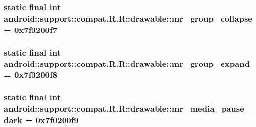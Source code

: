 \hypertarget{classandroid_1_1support_1_1compat_1_1_r_1_1drawable_46a75068daf21e12e8c830ebf70fca6a}{
\subsubsection[{mr\_\-group\_\-collapse}]{\setlength{\rightskip}{0pt plus 5cm}static final int android::support::compat.R.R::drawable::mr\_\-group\_\-collapse = 0x7f0200f7}}
\label{classandroid_1_1support_1_1compat_1_1_r_1_1drawable_46a75068daf21e12e8c830ebf70fca6a}


\hypertarget{classandroid_1_1support_1_1compat_1_1_r_1_1drawable_efa33ad04589d35f8db58c5b88a6b576}{
\subsubsection[{mr\_\-group\_\-expand}]{\setlength{\rightskip}{0pt plus 5cm}static final int android::support::compat.R.R::drawable::mr\_\-group\_\-expand = 0x7f0200f8}}
\label{classandroid_1_1support_1_1compat_1_1_r_1_1drawable_efa33ad04589d35f8db58c5b88a6b576}


\hypertarget{classandroid_1_1support_1_1compat_1_1_r_1_1drawable_a62a058ccf6dd81f9c4fe671102f3877}{
\subsubsection[{mr\_\-media\_\-pause\_\-dark}]{\setlength{\rightskip}{0pt plus 5cm}static final int android::support::compat.R.R::drawable::mr\_\-media\_\-pause\_\-dark = 0x7f0200f9}}
\label{classandroid_1_1support_1_1compat_1_1_r_1_1drawable_a62a058ccf6dd81f9c4fe671102f3877}


